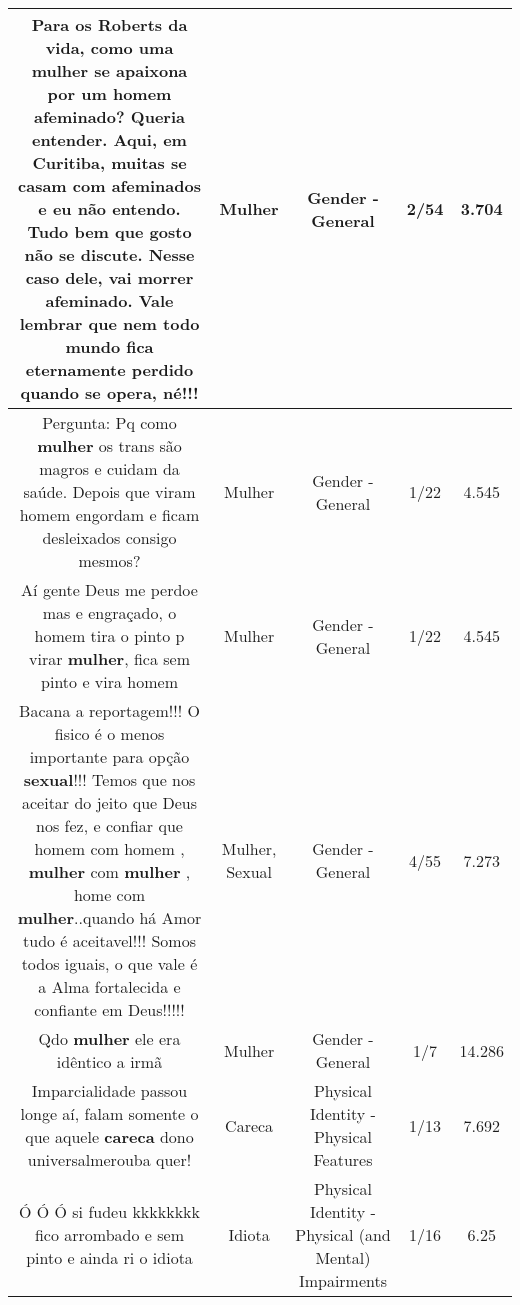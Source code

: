 \documentclass[11pt]{article}
\newlength\mylength
\begin{document}
\begin{center}
\begin{longtable}{|C{.65\mylength}|C{.30\mylength}|C{.12\mylength}|C{.12\mylength}|C{.12\mylength}|}
  \small Para os Roberts da vida, como uma \textbf{mulher} se apaixona por um homem afeminado? Queria entender. Aqui, em Curitiba, muitas se casam com afeminados e eu não entendo. Tudo bem que gosto não se discute. Nesse caso dele, vai morrer afeminado. Vale lembrar que nem todo mundo fica eternamente perdido quando se opera, né!!!\normalsize   & Mulher & Gender - General & 2/54 & 3.704 \\  \hline
  \small Pergunta: Pq como \textbf{mulher} os trans são magros e cuidam da saúde. Depois que viram homem engordam e ficam desleixados consigo mesmos?\normalsize   & Mulher & Gender - General & 1/22 & 4.545 \\  \hline
  \small Aí gente Deus me perdoe mas e engraçado, o homem tira o pinto p virar \textbf{mulher}, fica sem pinto e vira homem\normalsize   & Mulher & Gender - General & 1/22 & 4.545 \\  \hline
  \small Bacana a reportagem!!! O fisico é o menos importante para opção \textbf{sexual}!!! Temos que nos aceitar do jeito que Deus nos fez, e confiar que homem com homem , \textbf{mulher} com \textbf{mulher} , home com \textbf{mulher}..quando há Amor tudo é aceitavel!!! Somos todos iguais, o que vale é a Alma fortalecida e confiante em Deus!!!!!\normalsize   & Mulher, Sexual & Gender - General & 4/55 & 7.273 \\  \hline
  \small Qdo \textbf{mulher} ele era idêntico a irmã\normalsize   & Mulher & Gender - General & 1/7 & 14.286 \\  \hline
  \small Imparcialidade passou longe aí, falam somente o que aquele \textbf{careca} dono universalmerouba quer!\normalsize   & Careca & Physical Identity - Physical Features & 1/13 & 7.692 \\  \hline
  \small Ó Ó Ó si fudeu kkkkkkkk fico arrombado e sem pinto e ainda ri o idiota\normalsize   & Idiota & Physical Identity - Physical (and Mental) Impairments & 1/16 & 6.25 \\  \hline

\end{longtable}
\end{center}
\end{document}

